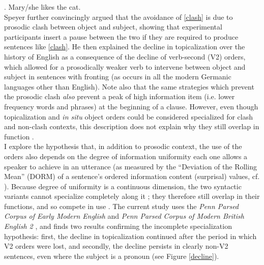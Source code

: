 \documentclass[12pt]{article}
\begin{document}
\ex. \label{insitu} Mary/she likes the cat.\\ 

\noindent Speyer further convincingly argued that the avoidance of \ref{clash} is due to prosodic clash between object and subject, showing that experimental participants insert a pause between the two if they are required to produce sentences like \ref{clash}. He then explained the decline in topicalization over the history of English as a consequence of the decline of verb-second (V2) orders, which allowed for a prosodically weaker verb to intervene between object and subject in sentences with fronting (as occurs in all the modern Germanic languages other than English). Note also that the same strategies which prevent the prosodic clash \textsl{also} prevent a peak of high information item (i.e. lower frequency words and phrases) at the beginning of a clause. However, even though topicalization and \textsl{in situ} object orders could be considered specialized for clash and non-clash contexts, this description does not explain why they still overlap in function \cite{prince1998}. \\

\noindent I explore the hypothesis that, in addition to prosodic context, the use of the orders also depends on the degree of information uniformity each one allows a speaker to achieve in an utterance (as measured by the ``Deviation of the Rolling Mean'' (DORM) of a sentence's ordered information content (surprisal) values, cf. \citealt{cuskleyetal2021, wallenbergetal2021}). Because degree of uniformity is a continuous dimension, the two syntactic variants cannot specialize completely along it \citep{wallenberg2016, wallenberg2019}; they therefore still overlap in their functions, and so compete in use \cite{kroch1994}. The current study uses the \textsl{Penn Parsed Corpus of Early Modern English} and \textsl{Penn Parsed Corpus of Modern British English 2} \citep[PPCEME, PPCMBE2;][]{ppceme, ppcmbe2}, and finds two results confirming the incomplete specialization hypothesis: first, the decline in topicalization continued after the period in which V2 orders were lost, and secondly, the decline persists in clearly non-V2 sentences, even where the subject is a pronoun (see Figure \ref{decline}). \\
\end{document}
